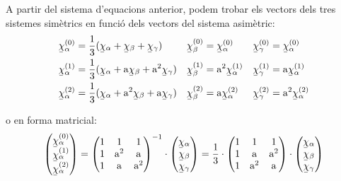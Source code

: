 A partir del sistema d'equacions anterior, podem trobar els vectors
dels tres sistemes sim\`{e}trics en funci\'{o} dels vectors del sistema
asim\`{e}tric:
\begin{subequations}
\begin{align}
   \cmplx{\chi}_\alpha\ap{(0)} &= \frac{1}{3} (\cmplx{\chi}_\alpha + \cmplx{\chi}_\beta +
   \cmplx{\chi}_\gamma) & \cmplx{\chi}_\beta\ap{(0)} &= \cmplx{\chi}_\alpha\ap{(0)} &
   \cmplx{\chi}_\gamma\ap{(0)} &= \cmplx{\chi}_\alpha\ap{(0)}
   \label{eq:c_sim_c2}\\
   \cmplx{\chi}_\alpha\ap{(1)} &= \frac{1}{3} (\cmplx{\chi}_\alpha + \au \cmplx{\chi}_\beta +
   \au^2 \cmplx{\chi}_\gamma) & \cmplx{\chi}_\beta\ap{(1)} &= \au^2 \cmplx{\chi}_\alpha\ap{(1)} &
   \cmplx{\chi}_\gamma\ap{(1)} &= \au \cmplx{\chi}_\alpha\ap{(1)} \label{eq:c_sim_a2} \\
   \cmplx{\chi}_\alpha\ap{(2)} &= \frac{1}{3} (\cmplx{\chi}_\alpha + \au^2 \cmplx{\chi}_\beta +
   \au \cmplx{\chi}_\gamma) & \cmplx{\chi}_\beta\ap{(2)} &= \au \cmplx{\chi}_\alpha\ap{(2)} &
   \cmplx{\chi}_\gamma\ap{(2)} &= \au^2 \cmplx{\chi}_\alpha\ap{(2)} \label{eq:c_sim_b2}
\end{align}
\end{subequations}

o en forma matricial:
\begin{equation}
   \begin{pmatrix}
     \cmplx{\chi}_\alpha\ap{(0)} \\
     \cmplx{\chi}_\alpha\ap{(1)} \\
     \cmplx{\chi}_\alpha\ap{(2)}
   \end{pmatrix} =
   \begin{pmatrix}
     1 & 1 & 1 \\
     1 & \au^2 & \au\\
     1 & \au & \au^2
   \end{pmatrix}^{-1} \cdot
   \begin{pmatrix}
     \cmplx{\chi}_\alpha \\
     \cmplx{\chi}_\beta \\
     \cmplx{\chi}_\gamma
   \end{pmatrix} =  \frac{1}{3} \cdot
   \begin{pmatrix}
     1 & 1 & 1 \\
     1 & \au & \au^2 \\
     1 & \au^2 & \au
   \end{pmatrix} \cdot
   \begin{pmatrix}
     \cmplx{\chi}_\alpha \\
     \cmplx{\chi}_\beta \\
     \cmplx{\chi}_\gamma
   \end{pmatrix}
\end{equation}

